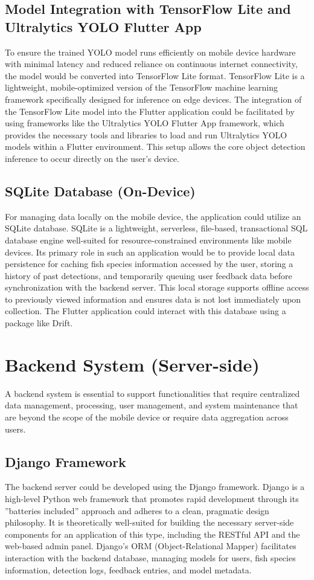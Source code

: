 \subsection{Model Integration with TensorFlow Lite and Ultralytics YOLO Flutter App}
To ensure the trained YOLO model runs efficiently on mobile device hardware with minimal latency and
reduced reliance on continuous internet connectivity, the model would be converted into TensorFlow Lite
format. TensorFlow Lite is a lightweight, mobile-optimized version of the TensorFlow machine learning
framework specifically designed for inference on edge devices. The integration of the TensorFlow Lite model
into the Flutter application could be facilitated by using frameworks like the Ultralytics YOLO Flutter
App framework, which provides the necessary tools and libraries to load and run Ultralytics YOLO models
within a Flutter environment. This setup allows the core object detection inference to occur directly on the
user’s device.


\subsection{SQLite Database (On-Device)}
For managing data locally on the mobile device, the application could utilize an SQLite database. SQLite is
a lightweight, serverless, file-based, transactional SQL database engine well-suited for resource-constrained
environments like mobile devices. Its primary role in such an application would be to provide local data
persistence for caching fish species information accessed by the user, storing a history of past detections,
and temporarily queuing user feedback data before synchronization with the backend server. This local
storage supports offline access to previously viewed information and ensures data is not lost immediately
upon collection. The Flutter application could interact with this database using a package like Drift.


\section{Backend System (Server-side)}
A backend system is essential to support functionalities that require centralized data management, processing,
user management, and system maintenance that are beyond the scope of the mobile device or require data
aggregation across users.

\subsection{Django Framework}
The backend server could be developed using the Django framework. Django is a high-level Python web
framework that promotes rapid development through its ”batteries included” approach and adheres to a
clean, pragmatic design philosophy. It is theoretically well-suited for building the necessary server-side
components for an application of this type, including the RESTful API and the web-based admin panel.
Django’s ORM (Object-Relational Mapper) facilitates interaction with the backend database, managing
models for users, fish species information, detection logs, feedback entries, and model metadata.


